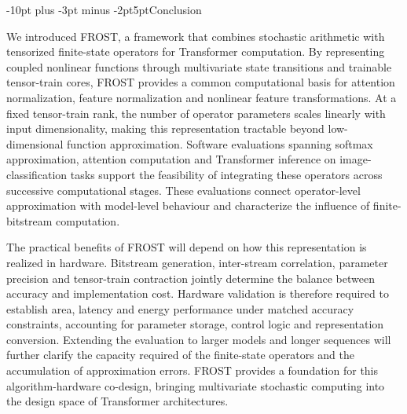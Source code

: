 \documentclass[pdflatex,sn-mathphys-num]{sn-jnl}
\makeatletter
\renewcommand\section{\@startsection{section}{1}{\z@}%
  {-10pt plus -3pt minus -2pt}{5pt}{\sectionfont}}
\theoremstyle{thmstyleone}
\theoremstyle{thmstyletwo}
\theoremstyle{thmstylethree}
\makeatother
\begin{document}
\FloatBarrier
\section{Conclusion}
\label{sec:conclusion}

We introduced FROST, a framework that combines stochastic arithmetic with tensorized finite-state operators for Transformer computation. By representing coupled nonlinear functions through multivariate state transitions and trainable tensor-train cores, FROST provides a common computational basis for attention normalization, feature normalization and nonlinear feature transformations. At a fixed tensor-train rank, the number of operator parameters scales linearly with input dimensionality, making this representation tractable beyond low-dimensional function approximation. Software evaluations spanning softmax approximation, attention computation and Transformer inference on image-classification tasks support the feasibility of integrating these operators across successive computational stages. These evaluations connect operator-level approximation with model-level behaviour and characterize the influence of finite-bitstream computation.

The practical benefits of FROST will depend on how this representation is realized in hardware. Bitstream generation, inter-stream correlation, parameter precision and tensor-train contraction jointly determine the balance between accuracy and implementation cost. Hardware validation is therefore required
to establish area, latency and energy performance under matched accuracy constraints, accounting for parameter storage, control logic and representation conversion. Extending the evaluation to larger models and longer sequences will further clarify the capacity required of the finite-state operators and the accumulation of approximation errors. FROST provides a foundation for this
algorithm-hardware co-design, bringing multivariate stochastic computing into the design space of Transformer architectures.


\end{document}

